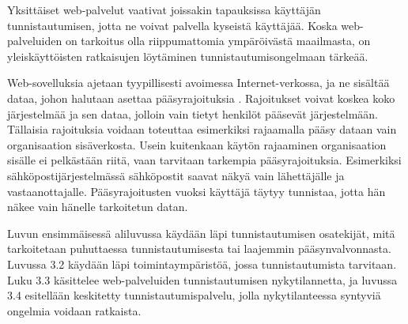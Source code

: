 Yksittäiset web-palvelut vaativat joissakin tapauksissa käyttäjän tunnistautumisen, jotta ne voivat palvella kyseistä käyttäjää. Koska web-palveluiden on tarkoitus olla riippumattomia ympäröivästä maailmasta, on yleiskäyttöisten ratkaisujen löytäminen tunnistautumisongelmaan tärkeää.

Web-sovelluksia ajetaan tyypillisesti avoimessa Internet-verkossa, ja ne sisältää dataa, johon halutaan asettaa pääsyrajoituksia \cite{inside_the_identity_management_game}. Rajoitukset voivat koskea koko järjestelmää ja sen dataa, jolloin vain tietyt henkilöt pääsevät järjestelmään. Tällaisia rajoituksia voidaan toteuttaa esimerkiksi rajaamalla pääsy dataan vain organisaation sisäverkosta. Usein kuitenkaan käytön rajaaminen organisaation sisälle ei pelkästään riitä, vaan tarvitaan tarkempia pääsyrajoituksia. Esimerkiksi sähköpostijärjestelmässä sähköpostit saavat näkyä vain lähettäjälle ja vastaanottajalle. Pääsyrajoitusten vuoksi käyttäjä täytyy tunnistaa, jotta hän näkee vain hänelle tarkoitetun datan.

Luvun ensimmäisessä aliluvussa käydään läpi tunnistautumisen osatekijät, mitä tarkoitetaan puhuttaessa tunnistautumisesta tai laajemmin pääsynvalvonnasta. Luvussa 3.2 käydään läpi toimintaympäristöä, jossa tunnistautumista tarvitaan. Luku 3.3 käsittelee web-palveluiden tunnistautumisen nykytilannetta, ja luvussa 3.4 esitellään keskitetty tunnistautumispalvelu, jolla nykytilanteessa syntyviä ongelmia voidaan ratkaista.